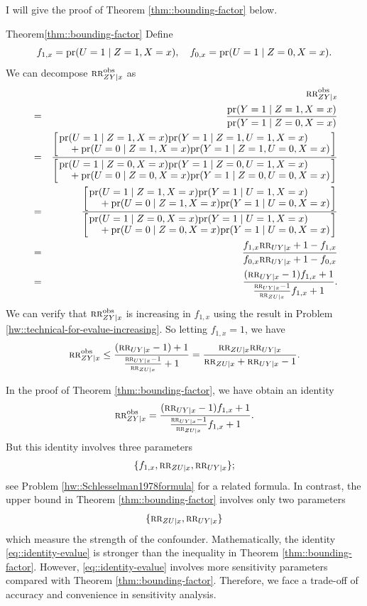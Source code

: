 I will give the proof of Theorem \ref{thm::bounding-factor}  below. 


\begin{myproof}{Theorem}{\ref{thm::bounding-factor}}
Define 
$$ 
f_{1,x} = \textup{pr}(U=1\mid Z=1,X=x),\quad
f_{0,x}  = \textup{pr}(U=1\mid Z=0,X=x) .
$$ 
We can decompose $\textsc{rr}_{ZY\mid x}^{\textup{obs}}$ as
\begin{eqnarray*}
&&\RR_{ZY\mid x}^\obs  \\
&=& \frac{  \pr( Y  = 1\mid Z=1, X=x  ) }{ \pr( Y  = 1\mid  Z=0,  X=x  ) } \\
&=& \frac{ \left[ \splitfrac{ \pr(U=1\mid Z=1,  X=x) \pr( Y  = 1\mid Z=1, U=1,  X=x  ) }{+ \pr(U=0\mid Z=1,  X=x) \pr( Y  = 1\mid Z=1, U=0,  X=x  )} \right]}
{ \left[ \splitfrac{\pr(U=1\mid Z=0,  X=x) \pr( Y  = 1\mid  Z=0, U=1,  X=x  )}{  +  \pr(U=0\mid Z=0,  X=x) \pr( Y  = 1\mid  Z=0, U=0,  X=x  ) } \right]  } \\
&=& \frac{ \left[ \splitfrac{ \pr(U=1\mid Z=1,  X=x) \pr( Y  = 1\mid U=1,  X=x  ) }{+ \pr(U=0\mid Z=1,  X=x) \pr( Y  = 1\mid U=0,  X=x  )}\right] }
{  \left[ \splitfrac{ \pr(U=1\mid Z=0,  X=x) \pr( Y  = 1\mid   U=1,  X=x  )  }{+  \pr(U=0\mid Z=0,  X=x) \pr( Y  = 1\mid  U=0,  X=x  ) }\right]  } \\
&=& \frac{  f_{1,x} \RR_{UY\mid x} + 1- f_{1,x}  }{ f_{0,x} \RR_{UY\mid x} + 1- f_{0,x}  } \\
&=& \frac{  (\RR_{UY\mid x} - 1) f_{1,x} + 1  }{      \frac{  \RR_{UY\mid x} - 1}{  \RR_{ZU\mid x} }    f_{1,x} + 1  } .
\end{eqnarray*}
We can verify that $\textsc{rr}_{ZY\mid x}^{\textup{obs}}$ is increasing in $f_{1,x} $ using the result in Problem \ref{hw::technical-for-evalue-increasing}. So letting $f_{1,x} = 1$, we have
$$
\textsc{rr}_{ZY\mid x}^{\textup{obs}} \leq \frac{  (\textsc{rr}_{UY\mid x} - 1) + 1  }{      \frac{  \textsc{rr}_{UY\mid x} - 1}{  \textsc{rr}_{ZU\mid x} }    + 1  }
= \frac{ \textsc{rr}_{ZU\mid x}  \textsc{rr}_{UY\mid x} }{  \textsc{rr}_{ZU\mid x} + \textsc{rr}_{UY\mid x} - 1} .
$$
\end{myproof}

In the proof of Theorem \ref{thm::bounding-factor}, we have obtain an identity
\begin{equation}
\label{eq::identity-evalue}
\RR_{ZY\mid x}^\obs = \frac{  (\RR_{UY\mid x} - 1) f_{1,x} + 1  }{      \frac{  \RR_{UY\mid x} - 1}{  \RR_{ZU\mid x} }    f_{1,x} + 1  } .
\end{equation}
But this identity involves three parameters 
$$
\{  f_{1,x}, \textsc{rr}_{ZU\mid x},  \textsc{rr}_{UY\mid x}  \} ;
$$
see Problem \ref{hw::Schlesselman1978formula} for a related formula. In contrast, the upper bound in Theorem \ref{thm::bounding-factor} involves only two parameters 
$$
\{  \textsc{rr}_{ZU\mid x},  \textsc{rr}_{UY\mid x}  \}
 $$
 which measure the strength of the confounder.
 Mathematically, the identity \ref{eq::identity-evalue} is stronger than the inequality in Theorem \ref{thm::bounding-factor}. However, \ref{eq::identity-evalue}  involves more sensitivity parameters compared with Theorem \ref{thm::bounding-factor}. Therefore, we face a trade-off of accuracy and convenience in sensitivity analysis.


